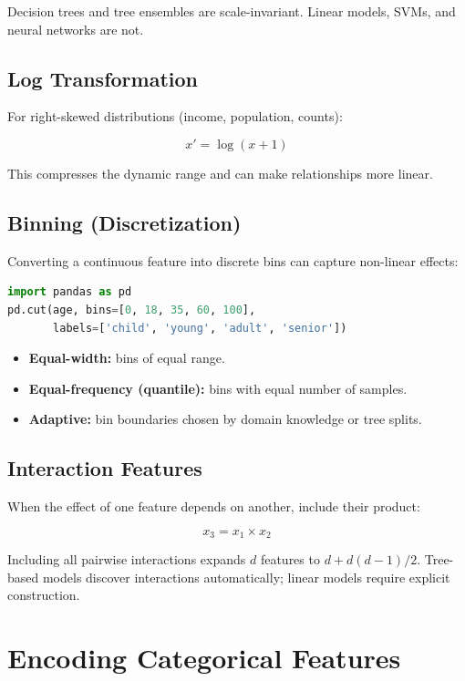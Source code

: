 Decision trees and tree ensembles are scale-invariant. Linear models, SVMs, and neural networks are not.

\subsection{Log Transformation}

For right-skewed distributions (income, population, counts):

\[
	x' = \log(x + 1)
\]

This compresses the dynamic range and can make relationships more linear.

\subsection{Binning (Discretization)}

Converting a continuous feature into discrete bins can capture non-linear effects:

\begin{lstlisting}[language=Python, caption=Equal-width binning]
import pandas as pd
pd.cut(age, bins=[0, 18, 35, 60, 100],
       labels=['child', 'young', 'adult', 'senior'])
\end{lstlisting}

\begin{itemize}
	\item \textbf{Equal-width:} bins of equal range.
	\item \textbf{Equal-frequency (quantile):} bins with equal number of samples.
	\item \textbf{Adaptive:} bin boundaries chosen by domain knowledge or tree splits.
\end{itemize}

\subsection{Interaction Features}

When the effect of one feature depends on another, include their product:

\[
	x_3 = x_1 \times x_2
\]

Including all pairwise interactions expands $d$ features to $d + d(d-1)/2$. Tree-based models discover interactions automatically; linear models require explicit construction.

\section{Encoding Categorical Features}


